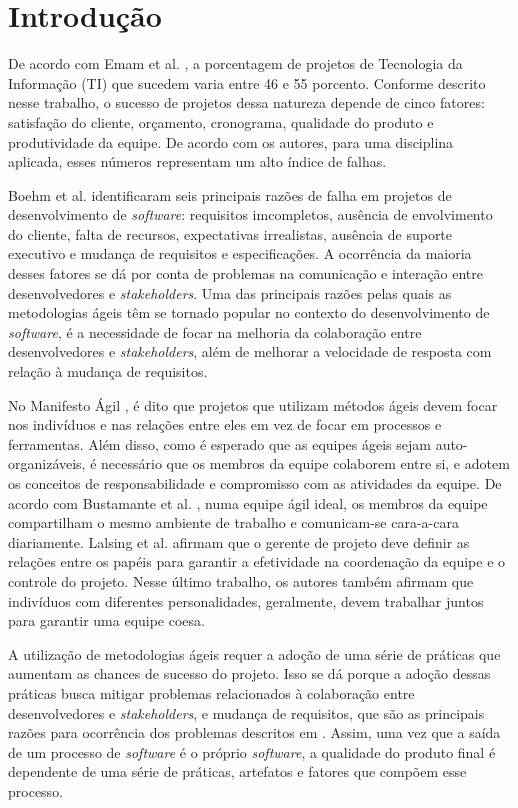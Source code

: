 \chapter{Introdução}
\label{introducao}

De acordo com Emam et al. \cite{emam}, a porcentagem de projetos de Tecnologia da Informação (TI) que sucedem varia entre 46 e 55 porcento. Conforme descrito nesse trabalho, o sucesso de projetos dessa natureza depende de cinco fatores: satisfação do cliente, orçamento, cronograma, qualidade do produto e produtividade da equipe. De acordo com os autores, para uma disciplina aplicada, esses números representam um alto índice de falhas.

Boehm et al. \cite{boehm} identificaram seis principais razões de falha em projetos de desenvolvimento de \textit{software}: requisitos imcompletos, ausência de envolvimento do cliente, falta de recursos, expectativas irrealistas, ausência de suporte executivo e mudança de requisitos e especificações. A ocorrência da maioria desses fatores se dá por conta de problemas na comunicação e interação entre desenvolvedores e \textit{stakeholders}. Uma das principais razões pelas quais as metodologias ágeis têm se tornado popular no contexto do desenvolvimento de \textit{software}, é a necessidade de focar na melhoria da colaboração entre desenvolvedores e \textit{stakeholders}, além de melhorar a velocidade de resposta com relação à mudança de requisitos.

No Manifesto Ágil \cite{manifesto}, é dito que projetos que utilizam métodos ágeis devem focar nos indivíduos e nas relações entre eles em vez de focar em processos e ferramentas. Além disso, como é esperado que as equipes ágeis sejam auto-organizáveis, é necessário que os membros da equipe colaborem entre si, e adotem os conceitos de responsabilidade e compromisso com as atividades da equipe. De acordo com Bustamante et al. \cite{bustamante}, numa equipe ágil ideal, os membros da equipe compartilham o mesmo ambiente de trabalho e comunicam-se cara-a-cara diariamente. Lalsing et al. \cite{lalsing} afirmam que o gerente de projeto deve definir as relações entre os papéis para garantir a efetividade na coordenação da equipe e o controle do projeto. Nesse último trabalho, os autores também afirmam que indivíduos com diferentes personalidades, geralmente, devem trabalhar juntos para garantir uma equipe coesa.

A utilização de metodologias ágeis requer a adoção de uma série de práticas que aumentam as chances de sucesso do projeto. Isso se dá porque a adoção dessas práticas busca mitigar problemas relacionados à colaboração entre desenvolvedores e \textit{stakeholders}, e mudança de requisitos, que são as principais razões para ocorrência dos problemas descritos em \cite{boehm}. Assim, uma vez que a saída de um processo de \textit{software} é o próprio \textit{software}, a qualidade do produto final é dependente de uma série de práticas, artefatos e fatores que compõem esse processo.

